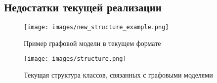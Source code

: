 \subsection{Недостатки текущей реализации}
\begin{frame}
	\begin{figure}
			\centering
			\texttt{[image: images/new\_structure\_example.png]}
			\caption{Пример графовой модели в текущем формате}
	\end{figure}
\end{frame}

\begin{frame}
	\begin{figure}
		\centering
		\texttt{[image: images/structure.png]}
		\caption{Текущая структура классов, связанных с графовыми моделями}
	\end{figure}
\end{frame}

